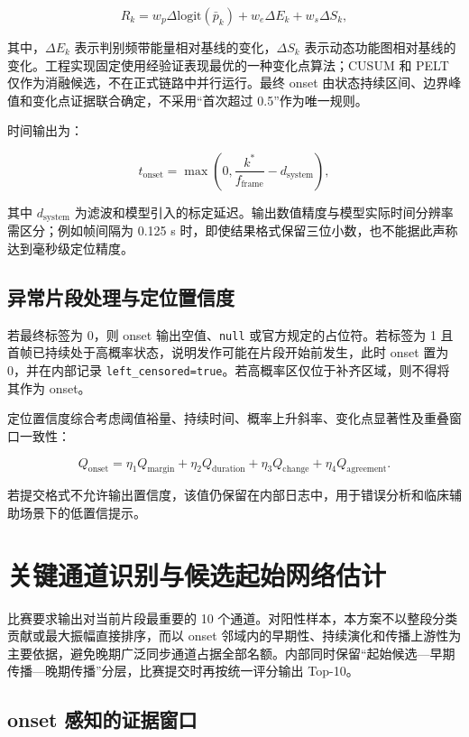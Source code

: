 $$
R_k=
w_p\Delta\mathrm{logit}(\bar p_k)
+w_e\Delta E_k
+w_s\Delta S_k,
$$

其中，$\Delta E_k$ 表示判别频带能量相对基线的变化，$\Delta S_k$ 表示动态功能图相对基线的变化。工程实现固定使用经验证表现最优的一种变化点算法；CUSUM 和 PELT 仅作为消融候选，不在正式链路中并行运行。最终 onset 由状态持续区间、边界峰值和变化点证据联合确定，不采用“首次超过 0.5”作为唯一规则。

时间输出为：

$$
t_{\mathrm{onset}}=
\max\left(0,\frac{k^*}{f_{\mathrm{frame}}}-d_{\mathrm{system}}\right),
$$

其中 $d_{\mathrm{system}}$ 为滤波和模型引入的标定延迟。输出数值精度与模型实际时间分辨率需区分；例如帧间隔为 0.125 s 时，即使结果格式保留三位小数，也不能据此声称达到毫秒级定位精度。

\subsection{异常片段处理与定位置信度}

若最终标签为 0，则 onset 输出空值、\texttt{null} 或官方规定的占位符。若标签为 1 且首帧已持续处于高概率状态，说明发作可能在片段开始前发生，此时 onset 置为 0，并在内部记录 \texttt{left\_censored=true}。若高概率区仅位于补齐区域，则不得将其作为 onset。

定位置信度综合考虑阈值裕量、持续时间、概率上升斜率、变化点显著性及重叠窗口一致性：

$$
Q_{\mathrm{onset}}=
\eta_1Q_{\mathrm{margin}}
+\eta_2Q_{\mathrm{duration}}
+\eta_3Q_{\mathrm{change}}
+\eta_4Q_{\mathrm{agreement}}.
$$

若提交格式不允许输出置信度，该值仍保留在内部日志中，用于错误分析和临床辅助场景下的低置信提示。

\clearpage
\section{关键通道识别与候选起始网络估计}

比赛要求输出对当前片段最重要的 10 个通道。对阳性样本，本方案不以整段分类贡献或最大振幅直接排序，而以 onset 邻域内的早期性、持续演化和传播上游性为主要依据，避免晚期广泛同步通道占据全部名额。内部同时保留“起始候选—早期传播—晚期传播”分层，比赛提交时再按统一评分输出 Top-10。

\subsection{onset 感知的证据窗口}

